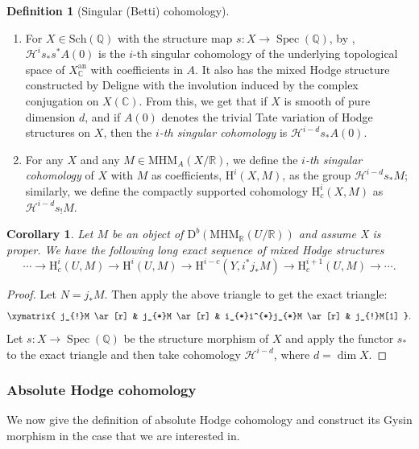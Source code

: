 \documentclass[11pt, a4paper]{amsart}
\theoremstyle{plain}
\newtheorem{corollary}[theorem]{Corollary}
\theoremstyle{definition}
\newtheorem{definition}[theorem]{Definition}
\numberwithin{equation}{section}
\def\CC{\mathbb{C}}
\def\QQ{\mathbb{Q}}
\def\RR{\mathbb{R}}
\DeclareMathOperator{\Spec}{Spec}
\begin{document}
\begin{definition}[Singular (Betti) cohomology]
    \begin{enumerate}
        \item 
        For $X \in \mathrm{Sch}(\QQ)$ with the structure map $s \colon X \rightarrow \Spec(\QQ)$, by \cite[Corollary A.1.7.c]{HW98}, $\mathcal{H}^{i}s_{*}s^{*}A(0)$ is the $i$-th singular cohomology of the underlying topological space of $X_{\CC}^{\mathrm{an}}$ with coefficients in $A$. It also has the mixed Hodge structure constructed by Deligne with the involution induced by the complex conjugation on $X(\CC)$. From this, we get that if $X$ is smooth of pure dimension $d$, and if $A(0)$ denotes the trivial Tate variation of Hodge structures on $X$, then the \textit{$i$-th singular cohomology} is $\mathcal{H}^{i-d}s_{*}A(0)$. 
        \item 
        For any $X$ and any $M \in \mathrm{MHM}_{A}(X/\RR)$, we define the \textit{$i$-th singular cohomology} of $X$ with $M$ as coefficients, $\mathrm{H}^{i}(X, M)$, as the group $\mathcal{H}^{i-d}s_{*}M$; similarly, we define the compactly supported cohomology $\mathrm{H}_{c}^{i}(X,M)$ as $\mathcal{H}^{i-d}s_{!}M$. 
    \end{enumerate}
\end{definition}

\begin{corollary}
\label{Corollary: Localization long exact seq}
    Let $M$ be an object of $\mathrm{D}^{b}(\mathrm{MHM}_{\RR}(U/\RR))$ and assume X is proper. We have the following long exact sequence of mixed Hodge structures
    \begin{equation} \label{eq: les of singular cohomology}
        \cdots \rightarrow \mathrm{H}_{c}^{i}(U,M) \rightarrow \mathrm{H}^{i}(U,M) \rightarrow \mathrm{H}^{i-c}(Y,i^{*}j_{*}M) \rightarrow \mathrm{H}_{c}^{i+1}(U,M)  \rightarrow \cdots.  
    \end{equation}
\end{corollary}
\begin{proof}
    Let $N = j_{*}M$. Then apply the above triangle to get the exact triangle:
    \[
        \xymatrix{
            j_{!}M \ar[r] & j_{*}M \ar[r] & i_{*}i^{*}j_{*}M \ar[r] & j_{!}M[1]
        }. 
    \]
    Let $s\colon X \rightarrow \Spec(\QQ)$ be the structure morphism of $X$ and apply the functor $s_{*}$ to the exact triangle and then take cohomology $\mathcal{H}^{i-d}$, where $d = \dim X$. 
\end{proof}

\subsubsection{Absolute Hodge cohomology}
We now give the definition of absolute Hodge cohomology and construct its Gysin morphism in the case that we are interested in. 
\end{document}
